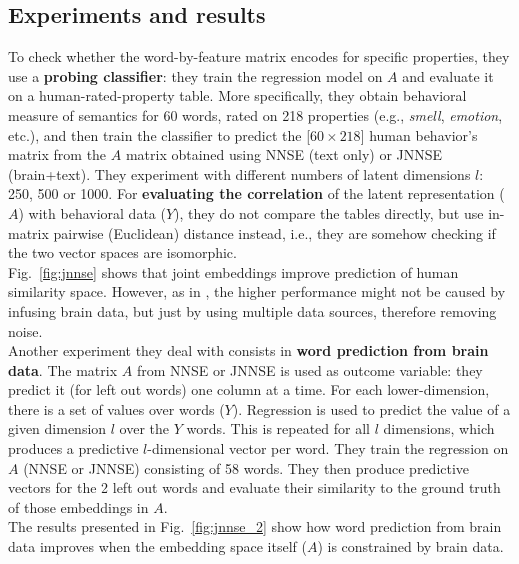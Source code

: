 \subsection{Experiments and results}
To check whether the word-by-feature matrix encodes for specific properties, they use a \textbf{probing classifier}: they train the regression model on $A$ and evaluate it on a human-rated-property table. More specifically, they obtain behavioral measure of semantics for 60 words, rated on 218 properties (e.g., \textit{smell}, \textit{emotion}, etc.), and then train the classifier to predict the [$60 \times 218$] human behavior's matrix from the $A$ matrix obtained using NNSE (text only) or JNNSE (brain+text). They experiment with different numbers of latent dimensions $l$: 250, 500 or 1000. For \textbf{evaluating the correlation} of the latent representation ($A$) with behavioral data ($Y$), they do not compare the tables directly, but use in-matrix pairwise (Euclidean) distance instead, i.e., they are somehow checking if the two vector spaces are isomorphic.\\
Fig.~\ref{fig:jnnse} shows that joint embeddings improve prediction of human similarity space. However, as in \cite{fong2017using}, the higher performance might not be caused by infusing brain data, but just by using multiple data sources, therefore removing noise.\\

Another experiment they deal with consists in \textbf{word prediction from brain data}. The matrix $A$ from NNSE or JNNSE is used as outcome variable: they predict it (for left out words) one column at a time. For each lower-dimension, there is a set of values over words ($Y$).
Regression is used to predict the value of a given dimension $l$ over the $Y$ words. This is repeated for all $l$ dimensions, which produces a predictive $l$-dimensional vector per word. They train the regression on $A$ (NNSE or JNNSE) consisting of 58 words. They then produce predictive vectors for the 2 left out words and evaluate their similarity to the ground truth of those embeddings in $A$.\\
The results presented in Fig.~\ref{fig:jnnse_2} show how word prediction from brain data improves when the embedding space itself ($A$) is constrained by brain data.

